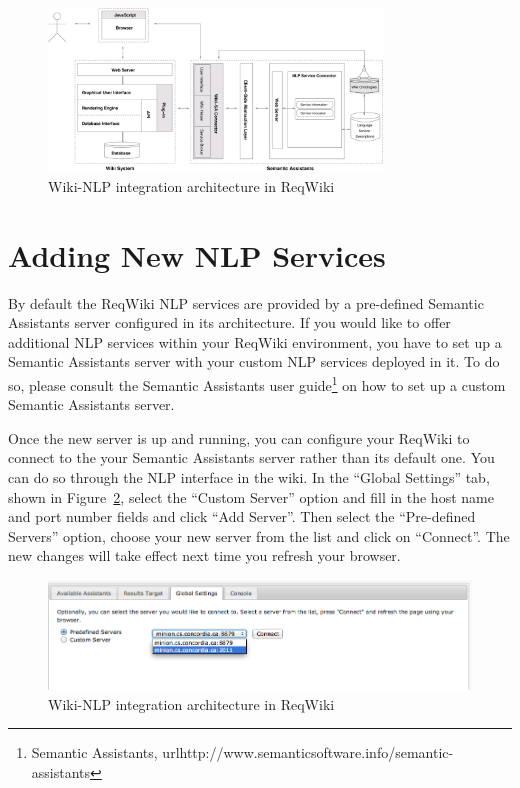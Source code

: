 \documentclass[10pt,twoside,openany,bibtotoc,liststotoc]{scrbook}
\newcommand{\sa}{Semantic Assistants\xspace}
\begin{document}
\begin{figure}[h!]
\centering
\includegraphics[width=0.79\textwidth]{wikinlp_arch}
\caption{Wiki-NLP integration architecture in ReqWiki}
\label{fig:wikinlp_arch}
\end{figure}

\section{Adding New NLP Services}
By default the ReqWiki NLP services are provided by a pre-defined \sa server configured in its architecture. If you would like to offer additional NLP services within your ReqWiki environment, you have to set up a \sa server with your custom NLP services deployed in it. To do so, please consult the \sa user guide\footnote{\sa, url{http://www.semanticsoftware.info/semantic-assistants}} on how to set up a custom \sa server.

Once the new server is up and running, you can configure your ReqWiki to connect to the your \sa server rather than its default one. You can do so through the NLP interface in the wiki. In the ``Global Settings'' tab, shown in Figure~\ref{fig:wikinlp_settings}, select the ``Custom Server'' option and fill in the host name and port number fields and click ``Add Server''. Then select the ``Pre-defined Servers'' option, choose your new server from the list and click on ``Connect''. The new changes will take effect next time you refresh your browser.

\begin{figure}[h!]
\centering
\includegraphics[width=\textwidth]{wikinlp_settings.png}
\caption{Wiki-NLP integration architecture in ReqWiki}
\label{fig:wikinlp_settings}
\end{figure}

\backmatter


\end{document}
